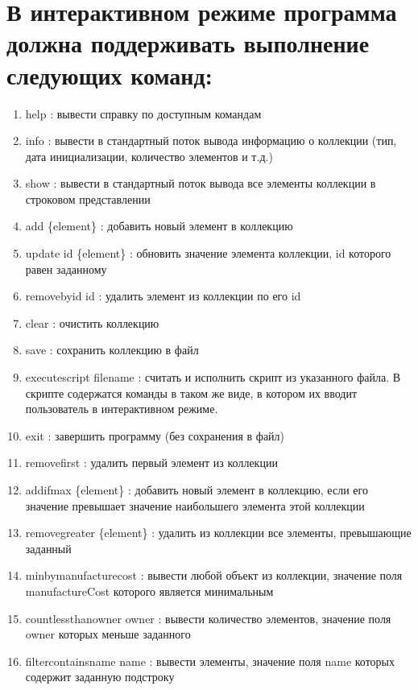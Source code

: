 \documentclass{article}
\begin{document}
\section*{В интерактивном режиме программа должна поддерживать выполнение следующих команд:}
\begin{enumerate}
  \item help : вывести справку по доступным командам
  \item info : вывести в стандартный поток вывода информацию о коллекции (тип, дата инициализации, количество элементов и т.д.)
  \item show : вывести в стандартный поток вывода все элементы коллекции в строковом представлении
  \item add \{element\} : добавить новый элемент в коллекцию
  \item update id \{element\} : обновить значение элемента коллекции, id которого равен заданному
  \item remove\textunderscore by\textunderscore id id : удалить элемент из коллекции по его id
  \item clear : очистить коллекцию
  \item save : сохранить коллекцию в файл
  \item execute\textunderscore script file\textunderscore name : считать и исполнить скрипт из указанного файла. В скрипте содержатся команды в таком же виде, в котором их вводит пользователь в интерактивном режиме.
  \item exit : завершить программу (без сохранения в файл)
  \item remove\textunderscore first : удалить первый элемент из коллекции
  \item add\textunderscore if\textunderscore max \{element\} : добавить новый элемент в коллекцию, если его значение превышает значение наибольшего элемента этой коллекции
  \item remove\textunderscore greater \{element\} : удалить из коллекции все элементы, превышающие заданный
  \item min\textunderscore by\textunderscore manufacture\textunderscore cost : вывести любой объект из коллекции, значение поля manufactureCost которого является минимальным
  \item count\textunderscore less\textunderscore than\textunderscore owner owner : вывести количество элементов, значение поля owner которых меньше заданного
  \item filter\textunderscore contains\textunderscore name name : вывести элементы, значение поля name которых содержит заданную подстроку
\end{enumerate}
\end{document}
